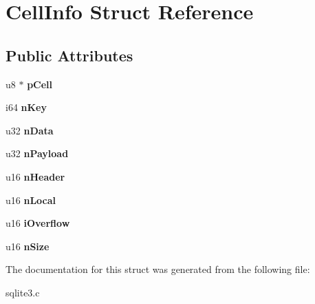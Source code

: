\hypertarget{struct_cell_info}{\section{Cell\-Info Struct Reference}
\label{struct_cell_info}
}
\subsection*{Public Attributes}
\begin{DoxyCompactItemize}
\item 
\hypertarget{struct_cell_info_a595ed7eeb60ea274d868f24347b7238e}{u8 $\ast$ {\bfseries p\-Cell}}\label{struct_cell_info_a595ed7eeb60ea274d868f24347b7238e}

\item 
\hypertarget{struct_cell_info_a542b041b9a54a13f7c6f2fe63e7542c0}{i64 {\bfseries n\-Key}}\label{struct_cell_info_a542b041b9a54a13f7c6f2fe63e7542c0}

\item 
\hypertarget{struct_cell_info_af2301ed16c35633ec6b5d7792734a4bf}{u32 {\bfseries n\-Data}}\label{struct_cell_info_af2301ed16c35633ec6b5d7792734a4bf}

\item 
\hypertarget{struct_cell_info_ac1e3c1b4216a8e778bbac82907bb1485}{u32 {\bfseries n\-Payload}}\label{struct_cell_info_ac1e3c1b4216a8e778bbac82907bb1485}

\item 
\hypertarget{struct_cell_info_a99bb1f87208f793359cf63e3d164025b}{u16 {\bfseries n\-Header}}\label{struct_cell_info_a99bb1f87208f793359cf63e3d164025b}

\item 
\hypertarget{struct_cell_info_a8cedbcc2c94916fe5798b502c614bb08}{u16 {\bfseries n\-Local}}\label{struct_cell_info_a8cedbcc2c94916fe5798b502c614bb08}

\item 
\hypertarget{struct_cell_info_af7be0161f1c67600aeba783a68972f70}{u16 {\bfseries i\-Overflow}}\label{struct_cell_info_af7be0161f1c67600aeba783a68972f70}

\item 
\hypertarget{struct_cell_info_ace78ab5eb5337b686e31b895feeb0562}{u16 {\bfseries n\-Size}}\label{struct_cell_info_ace78ab5eb5337b686e31b895feeb0562}

\end{DoxyCompactItemize}


The documentation for this struct was generated from the following file\-:\begin{DoxyCompactItemize}
\item 
sqlite3.\-c\end{DoxyCompactItemize}

